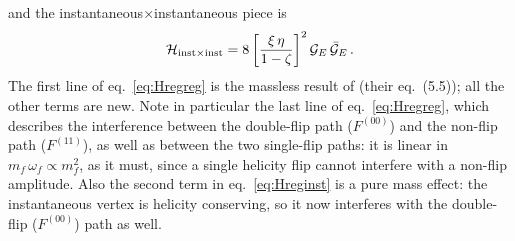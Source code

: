 \documentclass[11pt,a4paper]{article}
\newcommand{\calG}{\mathcal{G}}
\newcommand{\calH}{\mathcal{H}}
\numberwithin{equation}{section}
\begin{document}
and the instantaneous$\times$instantaneous piece is
\begin{align}
\label{eq:Hinstinst}
\calH_{\rm inst\times inst} = 8\left[\frac{\xi\,\eta}{1-\zeta}\right]^{2}
\calG_{E}\,\bar{\calG}_{E}\,.
\end{align}
The first line of eq.~\eqref{eq:Hregreg} is the massless result of \cite{Iancu:2022gpw}
(their eq.~(5.5)); all the other terms are new. Note in particular the last line of
eq.~\eqref{eq:Hregreg}, which describes the interference between the double-flip path
($F^{(00)}$) and the non-flip path ($F^{(11)}$), as well as between the two single-flip paths:
it is linear in $m_f\,\omega_f\propto m_f^2$, as it must, since a single helicity flip cannot
interfere with a non-flip amplitude. Also the second term in eq.~\eqref{eq:Hreginst} is a pure
mass effect: the instantaneous vertex is helicity conserving, so it now interferes with the
double-flip ($F^{(00)}$) path as well.
\end{document}
